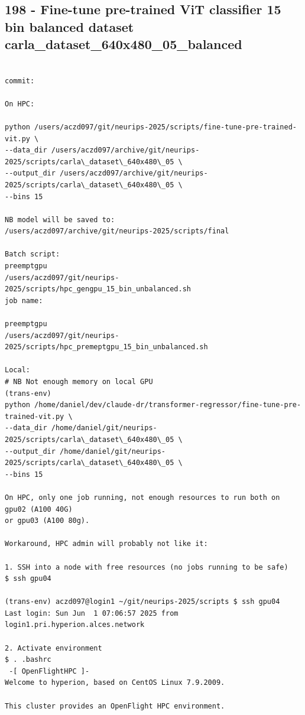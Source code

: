 \subsection{198 - Fine-tune pre-trained ViT classifier 15 bin balanced dataset carla\_dataset\_640x480\_05\_balanced}
\label{app_res:198}

\begin{verbatim}

commit:

On HPC:

python /users/aczd097/git/neurips-2025/scripts/fine-tune-pre-trained-vit.py \
--data_dir /users/aczd097/archive/git/neurips-2025/scripts/carla\_dataset\_640x480\_05 \
--output_dir /users/aczd097/archive/git/neurips-2025/scripts/carla\_dataset\_640x480\_05 \
--bins 15

NB model will be saved to:
/users/aczd097/archive/git/neurips-2025/scripts/final

Batch script:
preemptgpu
/users/aczd097/git/neurips-2025/scripts/hpc_gengpu_15_bin_unbalanced.sh
job name:

preemptgpu
/users/aczd097/git/neurips-2025/scripts/hpc_premeptgpu_15_bin_unbalanced.sh

Local:
# NB Not enough memory on local GPU
(trans-env)
python /home/daniel/dev/claude-dr/transformer-regressor/fine-tune-pre-trained-vit.py \
--data_dir /home/daniel/git/neurips-2025/scripts/carla\_dataset\_640x480\_05 \
--output_dir /home/daniel/git/neurips-2025/scripts/carla\_dataset\_640x480\_05 \
--bins 15

On HPC, only one job running, not enough resources to run both on gpu02 (A100 40G)
or gpu03 (A100 80g).

Workaround, HPC admin will probably not like it:

1. SSH into a node with free resources (no jobs running to be safe)
$ ssh gpu04

(trans-env) aczd097@login1 ~/git/neurips-2025/scripts $ ssh gpu04
Last login: Sun Jun  1 07:06:57 2025 from login1.pri.hyperion.alces.network

2. Activate environment
$ . .bashrc
 -[ OpenFlightHPC ]- 
Welcome to hyperion, based on CentOS Linux 7.9.2009.

This cluster provides an OpenFlight HPC environment.


\end{verbatim}
